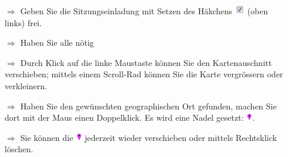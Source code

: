 \documentclass{article}
\begin{document}
\begin{multicols}{2}


\begin{tcolorbox}[colback=blue!5,colframe=blue!40!black,title=Eine Einladung bearbeiten / versenden]
\begin{itemize}
  \item[$\Longrightarrow$] Geben Sie die Sitzungseinladung mit Setzen des Häkchens \includegraphics[height=12pt]{Icons/sbox_ok.jpg} (oben links) frei.
  \item[$\Longrightarrow$] Haben Sie alle nötig
  \item[$\Longrightarrow$] Durch Klick auf die linke Maustaste können Sie den Kartenauschnitt verschieben; mittels einem Scroll-Rad können Sie die Karte vergrössern oder verkleinern.
  \item[$\Longrightarrow$] Haben Sie den gewünschten geographischen Ort gefunden, machen Sie dort mit der Maus einen Doppelklick. Es wird eine Nadel gesetzt: \includegraphics[height=10pt]{Icons/vNadel.jpg}.
	\item[$\Longrightarrow$] Sie können die \includegraphics[height=10pt]{Icons/vNadel.jpg} jederzeit wieder verschieben oder mittels Rechtsklick löschen.
\end{itemize}
\end{tcolorbox}


\end{multicols}

\end{document}
